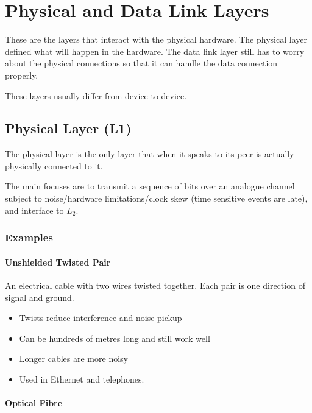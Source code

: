 \section{Physical and Data Link Layers}\label{sec:physical_and_data_link_layers}

These are the layers that interact with the physical hardware.
The physical layer defined what will happen in the hardware.
The data link layer still has to worry about the physical connections so that it can handle the data connection properly.

\begin{note}
	These layers usually differ from device to device.
\end{note}

\subsection{Physical Layer (L1)}\label{sub:physical_layer_or_mkl1_}

The physical layer is the only layer that when it speaks to its peer is actually physically connected to it.

The main focuses are to transmit a sequence of bits over an analogue channel subject to noise/hardware limitations/clock skew (time sensitive events are late), and interface to \(L_2\).

\subsubsection{Examples}\label{ssub:examples}

\paragraph{Unshielded Twisted Pair}\label{par:unshielded_twisted_pair}

An electrical cable with two wires twisted together.
Each pair is one direction of signal and ground.
\begin{itemize}
	\item Twists reduce interference and noise pickup
	\item Can be hundreds of metres long and still work well
	\item Longer cables are more noisy
	\item Used in Ethernet and telephones.
\end{itemize}

\paragraph{Optical Fibre}\label{par:optical_fibre}

